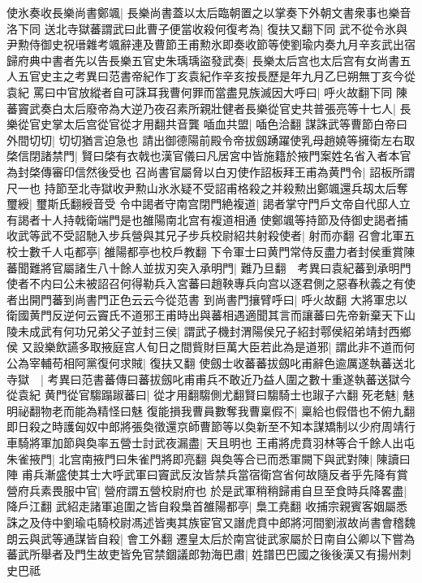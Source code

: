 使氷奏收長樂尚書鄭颯|{
	長樂尚書蓋以太后臨朝置之以掌奏下外朝文書衆事也樂音洛下同}
送北寺獄蕃謂武曰此曹子便當收殺何復考為|{
	復扶又翻下同}
武不從令氷與尹勲侍御史祝瑨雜考颯辭連及曹節王甫勲氷即奏收節等使劉瑜内奏九月辛亥武出宿歸府典中書者先以告長樂五官史朱瑀瑀盜發武奏|{
	長樂太后宫也太后宫有女尚書五人五官史主之考異曰范書帝紀作丁亥袁紀作辛亥按長歷是年九月乙巳朔無丁亥今從袁紀}
罵曰中官放縱者自可誅耳我曹何罪而當盡見族滅因大呼曰|{
	呼火故翻下同}
陳蕃竇武奏白太后廢帝為大逆乃夜召素所親壯健者長樂從官史共普張亮等十七人|{
	長樂從官史掌太后宫從官從才用翻共音龔}
喢血共盟|{
	喢色洽翻}
謀誅武等曹節白帝曰外間切切|{
	切切猶言迫急也}
請出御德陽前殿令帝拔劔踴躍使乳母趙嬈等擁衛左右取棨信閉諸禁門|{
	賢曰棨有衣戟也漢官儀曰凡居宮中皆施籍於掖門案姓名省入者本官為封棨傳審印信然後受也}
召尚書官屬脅以白刃使作詔板拜王甫為黄門令|{
	詔板所謂尺一也}
持節至北寺獄收尹勲山氷氷疑不受詔甫格殺之并殺勲出鄭颯還兵刼太后奪璽綬|{
	璽斯氏翻綬音受}
令中謁者守南宫閉門絶複道|{
	謁者掌守門戶文帝自代邸人立有謁者十人持戟衛端門是也雒陽南北宫有複道相通}
使鄭颯等持節及侍御史謁者捕收武等武不受詔馳入步兵營與其兄子步兵校尉紹共射殺使者|{
	射而亦翻}
召會北軍五校士數千人屯都亭|{
	雒陽都亭也校戶教翻}
下令軍士曰黄門常侍反盡力者封侯重賞陳蕃聞難將官屬諸生八十餘人並拔刃突入承明門|{
	難乃旦翻　考異曰袁紀蕃到承明門使者不内曰公未被詔召何得勒兵入宮蕃曰趙鞅專兵向宫以逐君側之惡春秋義之有使者出開門蕃到尚書門正色云云今從范書}
到尚書門攘臂呼曰|{
	呼火故翻}
大將軍忠以衛國黄門反逆何云竇氏不道邪王甫時出與蕃相遇適聞其言而讓蕃曰先帝新棄天下山陵未成武有何功兄弟父子並封三侯|{
	謂武子機封渭陽侯兄子紹封鄠侯紹弟靖封西鄉侯}
又設樂飲讌多取掖庭宫人旬日之間貲財巨萬大臣若此為是道邪|{
	謂此非不道而何}
公為宰輔苟相阿黨復何求賊|{
	復扶又翻}
使劔士收蕃蕃拔劔叱甫辭色逾厲遂執蕃送北寺獄　|{
	考異曰范書蕃傳曰蕃拔劔叱甫甫兵不敢近乃益人圍之數十重遂執蕃送獄今從袁紀}
黄門從官騶蹋踧蕃曰|{
	從才用翻騶側尤翻賢曰騶騎士也踧子六翻}
死老魅|{
	魅明祕翻物老而能為精怪曰魅}
復能損我曹員數奪我曹稟假不|{
	稟給也假借也不俯九翻}
即日殺之時護匈奴中郎將張奐徵還京師曹節等以奐新至不知本謀矯制以少府周靖行車騎將軍加節與奐率五營士討武夜漏盡|{
	天且明也}
王甫將虎賁羽林等合千餘人出屯朱雀掖門|{
	北宫南掖門曰朱雀門將即亮翻}
與奐等合已而悉軍闕下與武對陳|{
	陳讀曰陣}
甫兵漸盛使其士大呼武軍曰竇武反汝皆禁兵當宿衛宫省何故隨反者乎先降有賞營府兵素畏服中官|{
	營府謂五營校尉府也}
於是武軍稍稍歸甫自旦至食時兵降畧盡|{
	降戶江翻}
武紹走諸軍追圍之皆自殺梟首雒陽都亭|{
	梟工堯翻}
收捕宗親賓客姻屬悉誅之及侍中劉瑜屯騎校尉馮述皆夷其族宦官又譖虎賁中郎將河間劉淑故尚書會稽魏朗云與武等通謀皆自殺|{
	會工外翻}
遷皇太后於南宫徙武家屬於日南自公卿以下嘗為蕃武所舉者及門生故吏皆免官禁錮議郎勃海巴肅|{
	姓譜巴巴國之後後漢又有揚州刺史巴祗}
